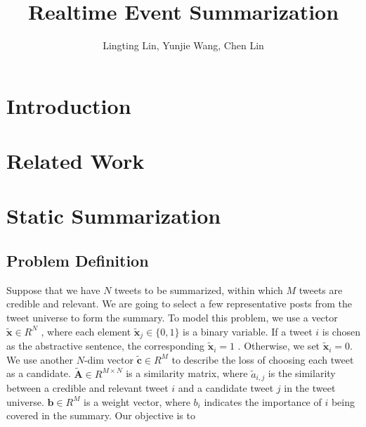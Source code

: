 \documentclass{article}
\author{Lingting Lin, Yunjie Wang, Chen Lin}
\title{Realtime Event Summarization}
\begin{document}
\maketitle
\section{Introduction}










\section{Related Work}

\section{Static Summarization}
\subsection{Problem Definition}
Suppose that we have $N$ tweets to be summarized, within which $M$ tweets are credible and relevant. We are going to select a few representative posts from the tweet universe to form the summary. To model this problem, we use a vector $\tilde{\mathbf{x}}\in R^N$ , where each element $\tilde{\mathbf{x}}_j\in \{0,1\}$ is a binary variable. If a tweet $i$ is chosen as the abstractive sentence, the corresponding $\tilde{\mathbf{x}}_i=1$ . Otherwise, we set  $\tilde{\mathbf{x}}_i=0$. We use another $N$-dim vector $\tilde{\mathbf{c}}\in R^M$ to describe the loss of choosing each tweet as a candidate. $\tilde{\mathbf{A}}\in R^{M\times N}$  is a similarity matrix, where $\tilde{a}_{i,j}$  is the similarity between a credible and relevant tweet $i$ and a candidate tweet $j$ in the tweet universe. $\mathbf{b}\in R^{M}$ is a weight vector, where $b_{i}$ indicates the importance of $i$ being covered in the summary. Our objective is to
\end{document}
